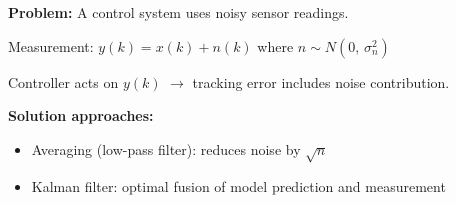 

\textbf{Problem:} A control system uses noisy sensor readings.

Measurement: $y(k) = x(k) + n(k)$ where $n \sim N(0,\, \sigma^{2}_{n})$

Controller acts on $y(k)$ \ensuremath{\to} tracking error includes noise contribution.

\textbf{Solution approaches:}

\begin{itemize}
\tightlist
\item
  Averaging (low-pass filter): reduces noise by $\sqrt{n}$
\item
  Kalman filter: optimal fusion of model prediction and measurement
\end{itemize}


